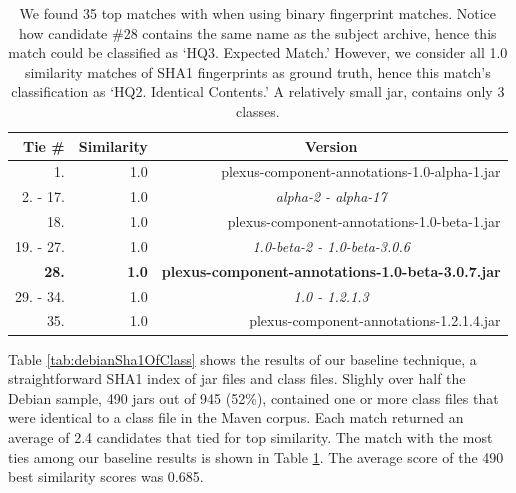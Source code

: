 \begin{table}[h]
    \centering
    \begin{tabular}[htbp]{r|r|r}
        \textbf{Tie \#}  & \textbf{Similarity} & \multicolumn{1}{c}{\textbf{Version}} \\
        \hline
        1.        & 1.0 &          plexus-component-annotations-1.0-alpha-1.jar  \\
        2. - 17.  & 1.0 &                            \multicolumn{1}{c}{\emph{alpha-2 - alpha-17}}  \\
        18.       & 1.0 &           plexus-component-annotations-1.0-beta-1.jar  \\
        19. - 27. & 1.0 &                   \multicolumn{1}{c}{\emph{1.0-beta-2 - 1.0-beta-3.0.6}}  \\
        \textbf{28.}       & \textbf{1.0} &       \textbf{plexus-component-annotations-1.0-beta-3.0.7.jar}  \\
        29. - 34. & 1.0 &                                 \multicolumn{1}{c}{\emph{1.0 - 1.2.1.3}}  \\
        35.       & 1.0 &              plexus-component-annotations-1.2.1.4.jar  \\
    \end{tabular}
    \caption{
    We found 35 top matches with
     when using
    binary fingerprint matches.  Notice how candidate \#28 contains the
    same name as the subject archive, hence this match could be classified
    as `HQ3. Expected Match.' However, we consider all 1.0 similarity
    matches of SHA1 fingerprints as ground truth, hence this match's
    classification as `HQ2. Identical Contents.' A relatively small jar,
     contains only 3
    classes.
    }
    \label{tab:sha1-of-class-35-matches}
\end{table}

Table \ref{tab:debianSha1OfClass} shows the results of our baseline
technique, a straightforward SHA1 index of jar files and class files.
Slighly over half the Debian sample, 490 jars out of 945 (52\%), contained
one or more class files that were identical to a class file in the Maven
corpus.  Each match returned an average of 2.4 candidates that tied for top
similarity.  The match with the most ties among our baseline results is
shown in Table \ref{tab:sha1-of-class-35-matches}.  The average score of
the 490 best similarity scores was 0.685.


